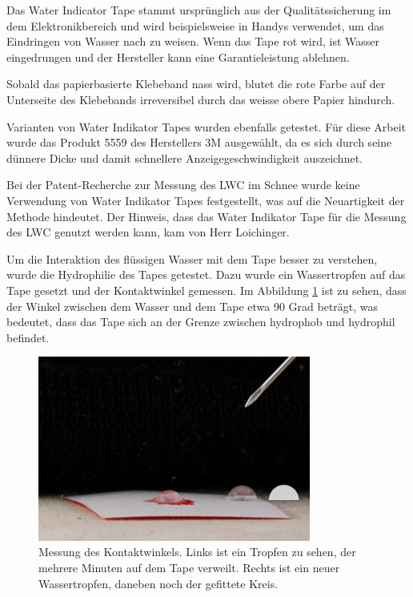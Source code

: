 Das Water Indicator Tape stammt ursprünglich aus der Qualitätssicherung im dem Elektronikbereich und wird beispielsweise in Handys verwendet, um das Eindringen von Wasser nach zu weisen. Wenn das Tape rot wird, ist Wasser eingedrungen und der Hersteller kann eine Garantieleistung ablehnen.

Sobald das papierbasierte Klebeband nass wird, blutet die rote Farbe auf der Unterseite des Klebebands irreversibel durch das weisse obere Papier hindurch.

 Varianten von Water Indikator Tapes wurden ebenfalls getestet. Für diese Arbeit wurde das Produkt 5559 des Herstellers 3M ausgewählt, da es sich durch seine dünnere Dicke und damit schnellere Anzeigegeschwindigkeit auszeichnet.

Bei der Patent-Recherche zur Messung des LWC im Schnee wurde keine Verwendung von Water Indikator Tapes festgestellt, was auf die Neuartigkeit der Methode hindeutet. Der Hinweis, dass das Water Indikator Tape für die Messung des LWC genutzt werden kann, kam von Herr Loichinger.

Um die Interaktion des flüssigen Wasser mit dem Tape besser zu verstehen, wurde die Hydrophilie des Tapes getestet. Dazu wurde ein Wassertropfen auf das Tape gesetzt und der Kontaktwinkel gemessen. Im Abbildung \ref{fig:winkTropf} ist zu sehen, dass der Winkel zwischen dem Wasser und dem Tape etwa 90 Grad beträgt, was bedeutet, dass das Tape sich an der Grenze zwischen hydrophob und hydrophil befindet.

\begin{figure}
    \centering
    \includegraphics[width=0.8\textwidth]{Bilder/IMG_6683.JPG}
    \caption{Messung des Kontaktwinkels. Links ist ein Tropfen zu sehen, der mehrere Minuten auf dem Tape verweilt. Rechts ist ein neuer Wassertropfen, daneben noch der gefittete Kreis.} 
    \label{fig:winkTropf}
\end{figure}

